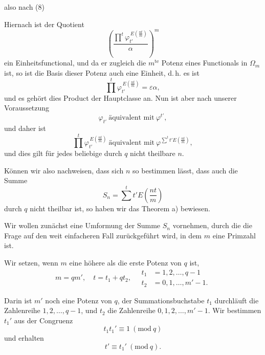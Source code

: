 also nach (8)

Hiernach ist der Quotient
\[
\left(\frac{\prod\limits^{t} \varphi_{t'}^{\,E\left(\frac{n t}{m}\right)}}{\alpha}\right)^m
\]
ein Einheitsfunctional, und da er zugleich die $m^{\text{te}}$ Potenz eines
Functionals in $\Omega_m$ ist, so ist die Basis dieser Potenz auch eine
Einheit, d.\,h. es ist
\[
\prod^{t} \varphi_{t'}^{\,E\left(\frac{n t}{m}\right)} = \varepsilon \alpha,
\]
und es gehört dies Product der Hauptclasse an. Nun ist aber
nach unserer Voraussetzung
\[
\varphi_{t'}\ \text{äquivalent mit}\ \varphi^{t'},
\]
und daher ist
\[
\prod^{t} \varphi_{t'}^{\,E\left(\frac{n t}{m}\right)}\ \text{äquivalent mit}\ \varphi^{\sum^{t} t' E\left(\frac{n t}{m}\right)},
\]
und dies gilt für jedes beliebige durch $q$ nicht theilbare $n$.

Können wir also nachweisen, dass sich $n$ so bestimmen
lässt, dass auch die Summe
\[
S_n = \sum^{t} t' E\left(\frac{n t}{m}\right)
\]
durch $q$ nicht theilbar ist, so haben wir das Theorem a) bewiesen.

Wir wollen zunächst eine Umformung der Summe $S_n$ vornehmen,
durch die die Frage auf den weit einfacheren Fall
zurückgeführt wird, in dem $m$ eine Primzahl ist.

Wir setzen, wenn $m$ eine höhere als die erste Potenz von
$q$ ist,
\[
m = q m', \quad t = t_1 + q t_2, \quad
\begin{aligned}
t_1 &= 1, 2, \dots, q-1 \\
t_2 &= 0, 1, \dots, m'-1.
\end{aligned}
\]

Darin ist $m'$ noch eine Potenz von $q$, der Summationsbuchstabe
 $t_1$ durchläuft die Zahlenreihe $1, 2, \dots, q-1$, und $t_2$
die Zahlenreihe $0, 1, 2, \dots, m'-1$. Wir bestimmen $t_1'$ aus der
Congruenz
\[
t_1 t_1' \equiv 1\ (\mathrm{mod}\ q)
\]
und erhalten
\[
t' \equiv t_1'\ (\mathrm{mod}\ q).
\]
